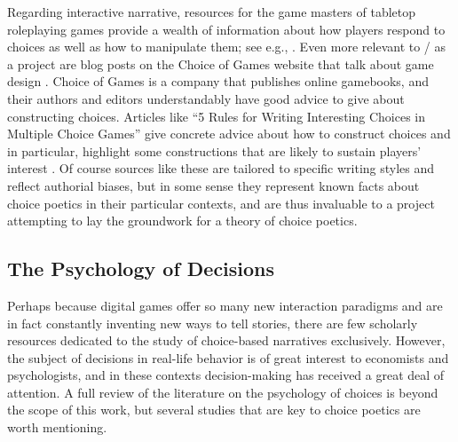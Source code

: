 Regarding interactive narrative, resources for the game masters of tabletop roleplaying games provide a wealth of information about how players respond to choices as well as how to manipulate them; see e.g., \citep{Laws2001}.
%
Even more relevant to \dunyazad/ as a project are blog posts on the Choice of Games website that talk about game design \citep{ChoiceOfGamesGameDesignCategory}.
%
Choice of Games is a company that publishes online gamebooks, and their authors and editors understandably have good advice to give about constructing choices.
%
Articles like ``5 Rules for Writing Interesting Choices in Multiple Choice Games'' give concrete advice about how to construct choices and in particular, highlight some constructions that are likely to sustain players' interest \citep{ChoiceOfGamesChoiceRules}.
%
Of course sources like these are tailored to specific writing styles and reflect authorial biases, but in some sense they represent known facts about choice poetics in their particular contexts, and are thus invaluable to a project attempting to lay the groundwork for a theory of choice poetics.


\subsection{The Psychology of Decisions}

Perhaps because digital games offer so many new interaction paradigms and are in fact constantly inventing new ways to tell stories, there are few scholarly resources dedicated to the study of choice-based narratives exclusively.
%
However, the subject of decisions in real-life behavior is of great interest to economists and psychologists, and in these contexts decision-making has received a great deal of attention.
%
A full review of the literature on the psychology of choices is beyond the scope of this work, but several studies that are key to choice poetics are worth mentioning.


